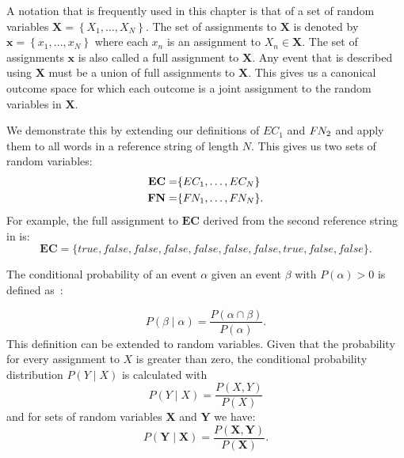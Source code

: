 \bigskip

A notation that is frequently used in this chapter is that of a set of \glspl{random variable} $\mathbf{X}=\left\{ X_1,\dots,X_N\right\}$.
The set of assignments to $\mathbf{X}$ is denoted by $\mathbf{x}=\left\{ x_1,\dots,x_N\right\}$ where each $x_n$ is an \gls{assignment} to $X_n\in\mathbf{X}$.
The set of assignments $\mathbf{x}$ is also called a \gls{full assignment} to $\mathbf{X}$.
Any \gls{event} that is described using $\mathbf{X}$ must be a union of \glspl{full assignment} to $\mathbf{X}$.
This gives us a \gls{canonical outcome space} for which each outcome is a joint assignment to the \glspl{random variable} in $\mathbf{X}$.

We demonstrate this by extending our definitions of $EC_1$ and $F\hspace{-0.07em} N_2$ and apply them to all words in a reference string of length $N$.
This gives us two sets of \glspl{random variable}:
\begin{equation*}
  \begin{split}
    \mathbf{EC}=& \{EC_1, \dots, EC_N\}\\
    \mathbf{FN}=& \{F\hspace{-0.07em} N_1, \dots, F\hspace{-0.07em} N_N\}.
  \end{split}
\end{equation*}
For example, the \gls{full assignment} to $\mathbf{EC}$ derived from the second reference string in  is:
\begin{equation*}
  \mathbf{EC}=\{\mathit{true}, \mathit{false}, \mathit{false}, \mathit{false}, \mathit{false}, \mathit{false}, \mathit{false}, \mathit{true}, \mathit{false}, \mathit{false}\}.
\end{equation*}

\bigskip

The \gls{conditional probability} of an \gls{event} $\alpha$ given an \gls{event} $\beta$ with $P(\alpha)>0$ is defined as~\cite{koller2009probabilistic}:

\begin{equation}
\label{equ:conditional-probability-event}
P(\beta\mid\alpha) = \frac{P(\alpha\cap\beta)}{P(\alpha)}.
\end{equation}
This definition can be extended to \glspl{random variable}.
Given that the probability for every assignment to $X$ is greater than zero, the \gls{conditional probability distribution} $P(Y\mid X)$ is calculated with
\begin{equation}
\label{equ:conditional-probability-random-variable}
P(Y\mid X) = \frac{P(X,Y)}{P(X)}
\end{equation}
and for sets of \glspl{random variable} $\mathbf{X}$ and $\mathbf{Y}$ we have:
\begin{equation}
\label{equ:conditional-probability-random-variable}
P(\mathbf{Y}\mid \mathbf{X}) = \frac{P(\mathbf{X},\mathbf{Y})}{P(\mathbf{X})}.
\end{equation}

